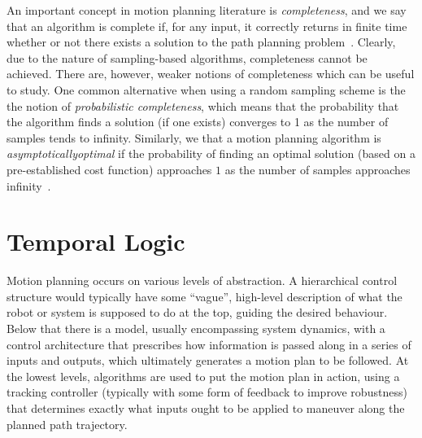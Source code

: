 An important concept in motion planning literature is {\em completeness}, and we say that an algorithm is complete if, for any input, it correctly returns in finite time whether or not there exists a solution to the path planning problem~\cite{LaValle2006}. Clearly, due to the nature of sampling-based algorithms, completeness cannot be achieved. There are, however, weaker notions of completeness which can be useful to study. One common alternative when using a random sampling scheme is the the notion of {\em probabilistic completeness}, which means that the probability that the algorithm finds a solution (if one exists) converges to 1 as the number of samples tends to infinity. Similarly, we that a motion planning algorithm is {\em asymptotically\/optimal} if the probability of finding an optimal solution (based on a pre-established cost function) approaches $1$ as the number of samples approaches infinity~\cite{Karaman2011}.




\section{Temporal Logic}


Motion planning occurs on various levels of abstraction. A hierarchical control structure would typically have some ``vague'', high-level description of what the robot or system is supposed to do at the top, guiding the desired behaviour. Below that there is a model, usually encompassing system dynamics, with a control architecture that prescribes how information is passed along in a series of inputs and outputs, which ultimately generates a motion plan to be followed. At the lowest levels, algorithms are used to put the motion plan in action, using a tracking controller (typically with some form of feedback to improve robustness) that determines exactly what inputs ought to be applied to maneuver along the planned path trajectory.

